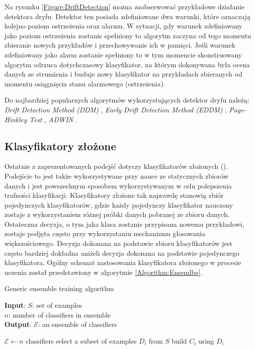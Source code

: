 \noindent Na rysunku \ref{Figure:DriftDetection} można zaobserwować przykładowe działanie detektora dryfu. Detektor ten posiada zdefiniowane dwa warunki, które oznaczają kolejno poziom ostrzeżenia oraz alarmu. W sytuacji, gdy warunek zdefiniowany jako poziom ostrzeżenia zostanie spełniony to algorytm zaczyna od tego momentu zbieranie nowych przykładów i przechowywanie ich w pamięci. Jeśli warunek zdefiniowany jako alarm zostanie spełniony to w tym momencie skonstruowany algorytm odrzuca dotychczasowy klasyfikator, na którym dokonywana była ocena danych ze strumienia i buduje nowy klasyfikator na przykładach zbieranych od momentu osiągnięcia stanu alarmowego (ostrzeżenia).

Do najbardziej popularnych algorytmów wykorzystujących detektor dryfu należą: \textit{Drift Detection Method (DDM)} \cite{Article:DriftDetection}, \textit{Early Drift Detection Method (EDDM)} \cite{Article:DriftDetection2}, \textit{Page-Hinkley Test} \cite{Article:PageHinkley}, \textit{ADWIN} \cite{Article:ADWIN}.

\subsection{Klasyfikatory złożone}

\noindent Ostatnie z zaprezentowanych podejść dotyczy klasyfikatorów złożonych (). Podejście to jest także wykorzystywane przy nauce ze statycznych zbiorów danych i jest powszechnym sposobem wykorzystywanym w celu polepszenia trafności klasyfikacji. Klasyfikatory złożone tak naprawdę stanowią zbiór pojedynczych klasyfikatorów, gdzie każdy pojedynczy klasyfikator nauczony zostaje z wykorzystaniem różnej próbki danych pobranej ze zbioru danych. Ostateczna decyzja, o tym jaka klasa zostanie przypisana nowemu przykładowi, zostaje podjęta często przy wykorzystaniu mechanizmu głosowania większościowego. Decyzja dokonana na podstawie zbioru klasyfikatorów jest często bardziej dokładna aniżeli decyzja dokonana na podstawie pojedynczego klasyfikatora. Ogólny schemat zastosowania klasyfikatora złożonego w procesie uczenia został przedstawiony w algorytmie \ref{Algorithm:Ensemlbe}.

\begin{algorithm}
    \caption{Generic ensemble training algorithm \cite{PHD:Kirkby}}\label{Algorithm:Ensemlbe}
    \textbf{Input}: $S$: set of examples \\
    \hspace*{12mm} $n$: number of classifiers in ensemble \\
    \textbf{Output}: $\mathcal{E}$: an ensemble of classifiers \\
    \begin{algorithmic}[1]
    \State $\mathcal{E} \gets n$ classifiers
    \State select a subset of examples $D_i$ from $S$
    \State build $C_i$ using $D_i$
    \EndFor
    \end{algorithmic}
\end{algorithm}

